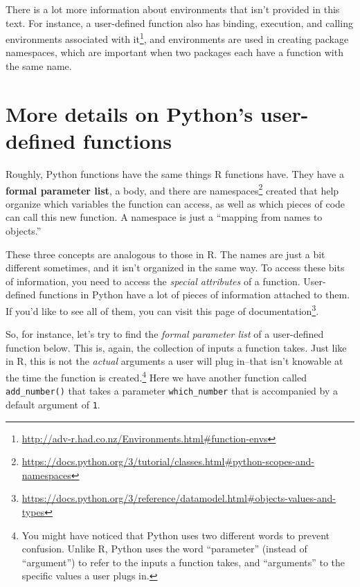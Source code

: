 \documentclass[
  12pt,
  krantz2]{krantz}
\renewcommand{\href}[2]{#2\footnote{\url{#1}}}
\begin{document}
\begin{rmd-details}
There is a lot more information about environments that isn't provided in this text. For instance, a user-defined function also has \href{http://adv-r.had.co.nz/Environments.html\#function-envs}{binding, execution, and calling environments associated with it}, and environments are used in creating package namespaces, which are important when two packages each have a function with the same name.

\end{rmd-details}

\hypertarget{more-details-on-pythons-user-defined-functions}{%
\section{More details on Python's user-defined functions}\label{more-details-on-pythons-user-defined-functions}}

Roughly, Python functions have the same things R functions have. They have a \textbf{formal parameter list}, a body, and there are \href{https://docs.python.org/3/tutorial/classes.html\#python-scopes-and-namespaces}{namespaces} created that help organize which variables the function can access, as well as which pieces of code can call this new function. A namespace is just a ``mapping from names to objects.''

These three concepts are analogous to those in R. The names are just a bit different sometimes, and it isn't organized in the same way. To access these bits of information, you need to access the \emph{special attributes} of a function. User-defined functions in Python have a lot of pieces of information attached to them. If you'd like to see all of them, you can visit \href{https://docs.python.org/3/reference/datamodel.html\#objects-values-and-types}{this page of documentation}.

So, for instance, let's try to find the \emph{formal parameter list} of a user-defined function below. This is, again, the collection of inputs a function takes. Just like in R, this is not the \emph{actual} arguments a user will plug in--that isn't knowable at the time the function is created.\footnote{You might have noticed that Python uses two different words to prevent confusion. Unlike R, Python uses the word ``parameter'' (instead of ``argument'') to refer to the inputs a function takes, and ``arguments'' to the specific values a user plugs in.} Here we have another function called \texttt{add\_number()} that takes a parameter \texttt{which\_number} that is accompanied by a default argument of \texttt{1}.
\end{document}
